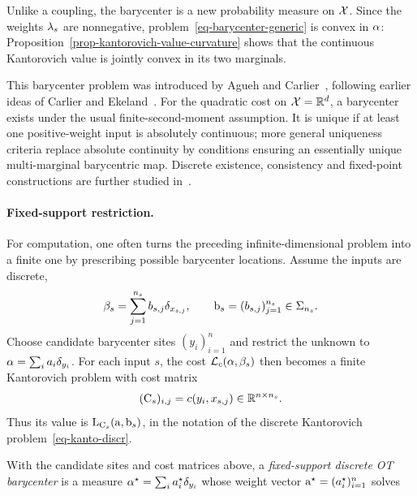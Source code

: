 Unlike a coupling, the barycenter is a new probability measure on $\mathcal{X}$. Since the weights $\lambda_s$ are nonnegative, problem~\eqref{eq-barycenter-generic} is convex in $\alpha$: Proposition~\ref{prop-kantorovich-value-curvature} shows that the continuous Kantorovich value is jointly convex in its two marginals.

This barycenter problem was introduced by Agueh and Carlier~\cite{Carlier_wasserstein_barycenter}, following earlier ideas of Carlier and Ekeland~\cite{carlierekelandmatching}. For the quadratic cost on $\mathcal{X}=\mathbb{R}^d$, a barycenter exists under the usual finite-second-moment assumption. It is unique if at least one positive-weight input is absolutely continuous; more general uniqueness criteria replace absolute continuity by conditions ensuring an essentially unique multi-marginal barycentric map. Discrete existence, consistency and fixed-point constructions are further studied in~\cite{anderes2016discrete,alvarez2016fixed,leGouic2016existence}.

\paragraph{Fixed-support restriction.}
For computation, one often turns the preceding infinite-dimensional problem into a finite one by prescribing possible barycenter locations. Assume the inputs are discrete,
\[
	\beta_s=\sum_{j=1}^{n_s} b_{s,j}\delta_{x_{s,j}},
	\qquad \mathrm{b}_s=(b_{s,j})_{j=1}^{n_s}\in\Sigma_{n_s}.
\]
Choose candidate barycenter sites $(y_i)_{i=1}^n$ and restrict the unknown to $\alpha=\sum_i a_i\delta_{y_i}$. For each input $s$, the cost $\mathcal{L}_c(\alpha,\beta_s)$ then becomes a finite Kantorovich problem with cost matrix
\[
	(\mathrm{C}_s)_{i,j}=c(y_i,x_{s,j}) \in \mathbb{R}^{n\times n_s}.
\]
Thus its value is $\mathrm{L}_{\mathrm{C}_s}(\mathrm{a},\mathrm{b}_s)$, in the notation of the discrete Kantorovich problem~\eqref{eq-kanto-discr}.

\begin{defn}\label{def-fixed-support-discrete-barycenter}
With the candidate sites and cost matrices above, a \emph{fixed-support discrete OT barycenter} is a measure $\alpha^\star=\sum_i a_i^\star\delta_{y_i}$ whose weight vector $\mathrm{a}^\star=(a_i^\star)_{i=1}^n$ solves
\end{defn}

